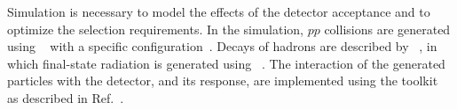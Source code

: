 

Simulation is necessary to model the effects of the detector acceptance and to optimize the selection requirements.
In the simulation, $pp$ collisions are generated using
\pythia~\cite{Sjostrand:2006za,*Sjostrand:2007gs} with a specific \lhcb
configuration~\cite{LHCb-PROC-2010-056}.  Decays of hadrons
are described by \evtgen~\cite{Lange:2001uf}, in which final-state
radiation is generated using \photos~\cite{Golonka:2005pn}. The
interaction of the generated particles with the detector, and its response,
are implemented using the \geant
toolkit~\cite{Allison:2006ve, *Agostinelli:2002hh} as described in
Ref.~\cite{LHCb-PROC-2011-006}.





